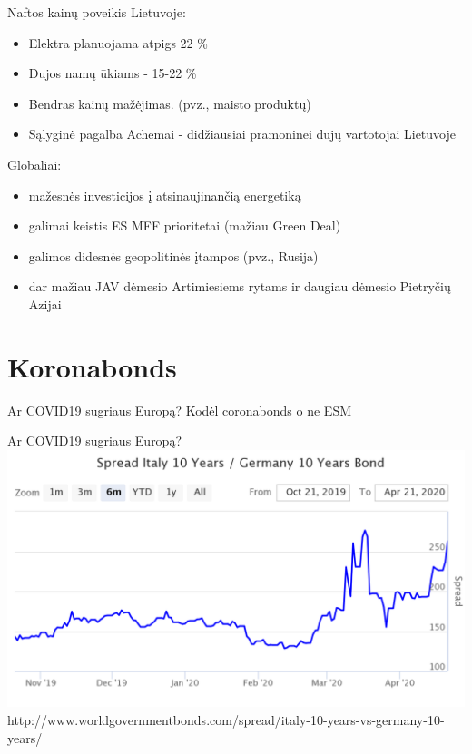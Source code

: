 \documentclass[11pt]{beamer}
\begin{document}
\begin{frame}{Naftos kainų poveikis}
Lietuvoje:
\begin{itemize}
\item Elektra planuojama atpigs 22 \%
\item Dujos namų ūkiams - 15-22 \%
\item Bendras kainų mažėjimas. (pvz., maisto produktų)
\item Sąlyginė pagalba Achemai - didžiausiai pramoninei dujų vartotojai Lietuvoje
\end{itemize}
Globaliai:
\begin{itemize}
\item mažesnės investicijos į atsinaujinančią energetiką
\item galimai keistis ES MFF prioritetai (mažiau Green Deal)
\item galimos didesnės geopolitinės įtampos (pvz., Rusija)
\item dar mažiau JAV dėmesio Artimiesiems rytams ir daugiau dėmesio Pietryčių Azijai
\end{itemize}
\end{frame}


\section{Koronabonds}

\begin{frame}{Ar COVID19 sugriaus Europą?}
Kodėl coronabonds o ne ESM
\end{frame}

\begin{frame}{Ar COVID19 sugriaus Europą?}
\includegraphics[scale=0.25]{spread-italy-10-years-ge.png}
http://www.worldgovernmentbonds.com/spread/italy-10-years-vs-germany-10-years/
\end{frame}
\end{document}
